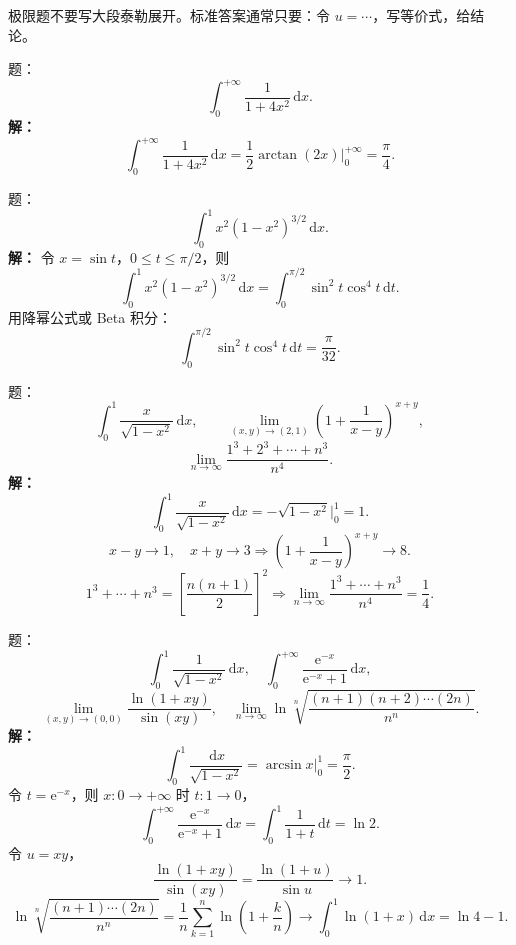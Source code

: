 \documentclass[11pt,a4paper,UTF8]{ctexart}
\newcommand{\dd}{\,\mathrm d}
\newcommand{\ee}{\mathrm e}
\begin{document}
\begin{scorebox}[得分点]
极限题不要写大段泰勒展开。标准答案通常只要：令 \(u=\cdots\)，写等价式，给结论。
\end{scorebox}

\newpage

\begin{answerbox}[2020--2021 简答 1：反常积分]
题：
\[
\int_0^{+\infty}\frac{1}{1+4x^2}\dd x.
\]
\textbf{解：}
\[
\int_0^{+\infty}\frac{1}{1+4x^2}\dd x
=\frac12\arctan(2x)\Big|_0^{+\infty}
=\boxed{\frac\pi4}.
\]
\end{answerbox}

\begin{answerbox}[2020--2021 计算 1：三角换元定积分]
题：
\[
\int_0^1 x^2(1-x^2)^{3/2}\dd x.
\]
\textbf{解：}
令 \(x=\sin t\)，\(0\le t\le \pi/2\)，则
\[
\int_0^1x^2(1-x^2)^{3/2}\dd x
=\int_0^{\pi/2}\sin^2t\cos^4t\dd t.
\]
用降幂公式或 Beta 积分：
\[
\int_0^{\pi/2}\sin^2t\cos^4t\dd t
=\boxed{\frac{\pi}{32}}.
\]
\end{answerbox}

\begin{answerbox}[2021--2022 简答 1、3、4：基础极限与积分]
题：
\[
\int_0^1\frac{x}{\sqrt{1-x^2}}\dd x,\qquad
\lim_{(x,y)\to(2,1)}\left(1+\frac1{x-y}\right)^{x+y},
\]
\[
\lim_{n\to\infty}\frac{1^3+2^3+\cdots+n^3}{n^4}.
\]
\textbf{解：}
\[
\int_0^1\frac{x}{\sqrt{1-x^2}}\dd x
=-\sqrt{1-x^2}\Big|_0^1=\boxed{1}.
\]
\[
x-y\to1,\quad x+y\to3
\Rightarrow
\left(1+\frac1{x-y}\right)^{x+y}\to \boxed{8}.
\]
\[
1^3+\cdots+n^3=\left[\frac{n(n+1)}2\right]^2
\Rightarrow
\lim_{n\to\infty}\frac{1^3+\cdots+n^3}{n^4}
=\boxed{\frac14}.
\]
\end{answerbox}

\begin{answerbox}
题：
\[
\int_0^1\frac{1}{\sqrt{1-x^2}}\dd x,\quad
\int_0^{+\infty}\frac{\ee^{-x}}{\ee^{-x}+1}\dd x,
\]
\[
\lim_{(x,y)\to(0,0)}\frac{\ln(1+xy)}{\sin(xy)},\quad
\lim_{n\to\infty}\ln\sqrt[n]{\frac{(n+1)(n+2)\cdots(2n)}{n^n}}.
\]
\textbf{解：}
\[
\int_0^1\frac{\dd x}{\sqrt{1-x^2}}=\arcsin x\Big|_0^1=\boxed{\frac\pi2}.
\]
令 \(t=\ee^{-x}\)，则 \(x:0\to+\infty\) 时 \(t:1\to0\)，
\[
\int_0^{+\infty}\frac{\ee^{-x}}{\ee^{-x}+1}\dd x
=\int_0^1\frac{1}{1+t}\dd t=\boxed{\ln2}.
\]
令 \(u=xy\)，
\[
\frac{\ln(1+xy)}{\sin(xy)}
=\frac{\ln(1+u)}{\sin u}\to\boxed{1}.
\]
\[
\ln\sqrt[n]{\frac{(n+1)\cdots(2n)}{n^n}}
=\frac1n\sum_{k=1}^n\ln\left(1+\frac kn\right)
\to\int_0^1\ln(1+x)\dd x
=\boxed{\ln4-1}.
\]
\end{answerbox}
\end{document}
